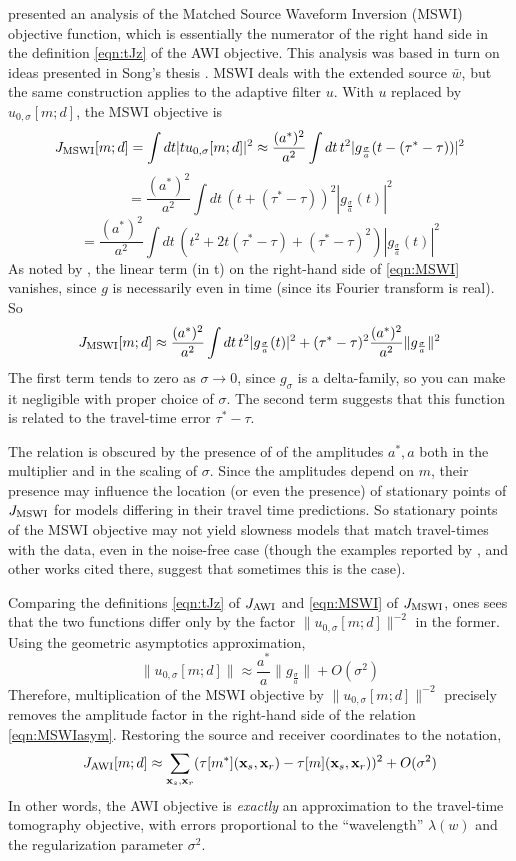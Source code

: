 \cite{HuangSymes2015SEG} presented an analysis of the Matched Source
Waveform Inversion (MSWI) objective function, which is essentially the
numerator of the right hand side in the definition
\ref{eqn:tJz} of the AWI objective. This analysis was based in turn on ideas presented in Song's thesis
\cite[]{Song:94c}. MSWI deals with the extended source $\bar{w}$, but
the same construction applies to the adaptive filter $u$. With $u$ replaced by $u_{0,\sigma}[m;d]$,  the MSWI objective is
\[
J_{\rm MSWI}[m;d] = \int dt |tu_{0,\sigma}[m;d]|^2 \approx \frac{(a^*)^2}{a^2} \int dt\, t^2|g_{\frac{\sigma}{a}}(t-(\tau^*-\tau))|^2
\]
\[
=\frac{(a^*)^2}{a^2} \int dt\, (t+(\tau^*-\tau))^2|g_{\frac{\sigma}{a}}(t)|^2
\]
\begin{equation}
  \label{eqn:MSWI}
  =\frac{(a^*)^2}{a^2} \int dt\, (t^2 + 2t
  (\tau^*-\tau)+(\tau^*-\tau)^2)|g_{\frac{\sigma}{a}}(t)|^2
\end{equation}
As noted by \cite{HuangSymes2015SEG}, the linear term (in t) on the
right-hand side of \ref{eqn:MSWI} vanishes,
since $g$ is necessarily even in time (since its Fourier transform is
real). So
\begin{equation}
  \label{eqn:MSWIasym}
  J_{\rm MSWI}[m;d] \approx
\frac{(a^*)^2}{a^2} \int dt\, t^2|g_{\frac{\sigma}{a}}(t)|^2
+(\tau^*-\tau)^2\frac{(a^*)^2}{a^2}\|g_{\frac{\sigma}{a}}\|^2
\end{equation}
The first term tends to zero as $\sigma \rightarrow 0$, since
$g_{\sigma}$ is a delta-family, so you can make it negligible with
proper choice of $\sigma$. The second term suggests that this function
is related to the travel-time error $\tau^*-\tau$.

The relation is obscured by the presence of of the amplitudes
$a^*, a$ both in the multiplier and in the scaling of $\sigma$. Since the
amplitudes depend on $m$, their presence may influence the location
(or even the presence) of stationary points of $J_{\rm MSWI}$ for
models differing in their travel time predictions. So stationary
points of the MSWI objective may not yield slowness models that match
travel-times with the data, even in the noise-free case (though
the examples reported by \cite{HuangSymes2015SEG, HuangSymes:Geo17}, and other works
cited there, suggest that sometimes this is the case).

Comparing the definitions \ref{eqn:tJz} of $J_{\rm AWI}$ and
\ref{eqn:MSWI} of $J_{\rm MSWI}$, ones sees
that the two functions differ only by the factor $\|u_{0,\sigma}[m;d]\|^{-2}$ in
the former. Using the geometric asymptotics approximation, 
$$
\|u_{0,\sigma}[m;d]\| \approx \frac{a^*}{a}\|g_{\frac{\sigma}{a}}\| + O(\sigma^2)
$$
Therefore, multiplication of the MSWI objective by $\|u_{0,\sigma}[m;d]\|^{-2}$
precisely removes the amplitude factor in the right-hand side of the
relation \ref{eqn:MSWIasym}. Restoring the source and receiver
coordinates to the notation,
$$
J_{\rm AWI}[m;d] \approx \sum_{{\bf x}_s,{\bf x}_r} (\tau[m^*]({\bf
  x}_s,{\bf x}_r)-\tau[m]({\bf x}_s,{\bf x}_r))^2 + O(\sigma^2)
$$
In other words, the AWI objective is {\em exactly} an approximation to
the travel-time tomography objective, with errors proportional to the
``wavelength'' $\lambda(w)$ and the regularization parameter
$\sigma^2$.

